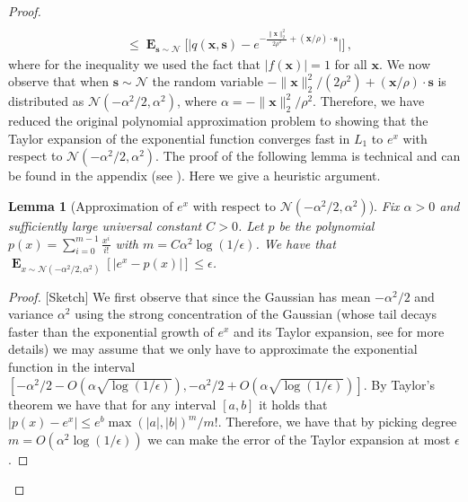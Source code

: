 \documentclass[10pt,a4paper]{article}
\newenvironment{subproof}{\begin{proof}[Proof]}{\end{proof}}
\newtheorem{lemma}{Lemma}[section]
\newcommand\twonorm[1]{\|#1\|_2}
\renewcommand\vec[1]{\mathbf{#1}}
\DeclareMathOperator*{\E}{\mathbf{E}}
\newcommand{\normal}{\mathcal{N}}
\newcommand{\eps}{\epsilon}
\newcommand{\1}{\Ind}
\newcommand{\x}{\vec x}
\newcommand{\Gauss}{\mathcal{N}}
\begin{document}
\begin{proof}
\begin{align}
    \nonumber
    \\
    &\leq 
    \E_{\vec s\sim \Gauss}\Big[\big|q(\x,\vec s)-e^{-\frac{\twonorm{\x}^2}{2\rho^2}+(\x/\rho)\cdot\vec s}\big| \Big]
    \,,
    \label{eq:error-of-delta}
    \end{align}
    where for the inequality we used the fact that $|f(\vec x)|=1$ for all $\x$.
    We now observe that when $\vec s \sim \normal$ the random variable 
    $-\|\x\|_2^2/(2 \rho^2) + (\x/\rho) \cdot \vec s$ is distributed as
    $\normal(-\alpha^2/2, \alpha^2)$, where $\alpha = -\|\x\|_2^2/\rho^2$.  
    Therefore, we have reduced the original polynomial approximation problem to showing that 
    the Taylor expansion of the exponential function converges fast in $L_1$ to $e^x$ with 
    respect to $\normal(-\alpha^2/2, \alpha^2)$.  The proof of the following lemma is technical 
    and can be found in the appendix (see ). Here we give
    a heuristic argument.
\begin{lemma}[Approximation of $e^x$ with respect to $\normal(-\alpha^2/2, \alpha^2)$]
\label{claim:approx_exp_pdf_taylor_main_body}
Fix $\alpha >0$ and sufficiently large universal constant $C>0$.
Let $p$ be the polynomial $p(x)=\sum_{i=0}^{m-1}\frac{x^{i}}{i!}$ with $m = C\alpha^2\log(1/\epsilon)$. 
We have that  $\E_{x\sim \normal(-\alpha^2/2,\alpha^2)}[|e^x-p(x)|]\leq \epsilon$.
\end{lemma}
\begin{subproof}[Sketch]
We first observe that since the Gaussian has mean $-\alpha^2/2$ and variance $\alpha^2$ using the 
strong concentration of the Gaussian (whose tail decays faster than the exponential growth of $e^x$ and
its Taylor expansion, see  for more details) we may assume that 
we only have to approximate the  exponential function in the interval 
$[-\alpha^2/2 - O(\alpha\sqrt{\log(1/\eps)}), -\alpha^2/2 + O(\alpha\sqrt{\log(1/\eps)})]$.
By Taylor's theorem we have that for any interval $[a,b]$ it holds that 
$|p(x) - e^x| \leq e^{b} \max(|a|, |b|)^m/m!$.  Therefore, we have that by picking degree 
$m = O(\alpha^2 \log(1/\eps))$ we can make the error of the Taylor expansion at most $\eps$.
\end{subproof}


\end{proof}
\end{document}
